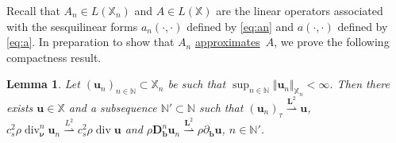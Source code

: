 \documentclass{m2an}
\newcommand{\csr}{c_s^2 \rho}
\newcommand{\nv}{\boldsymbol{\nu}}
\newcommand{\bflow}{\mathbf{b}}
\renewcommand{\u}{\mathbf{u}}
\renewcommand{\div}{\operatorname{div}}
\newcommand{\X}{\mathbb{X}}
\newcommand{\Xn}{\mathbb{X}_n}
\newcommand{\bD}{\mathbf{D}}
\newcommand{\bL}{\mathbf{L}}
\newcommand{\N}{\mathbb{N}}
\newcommand{\seq}[1]{(#1_n)_{n \in \mathbb{N}}}
\newcommand{\diffb}{\partial_{\bflow}}
\newcommand{\ddiffb}{\bD_{\bflow}^n}
\newcommand{\ddiv}{\div_{\nv}^n}
\newcommand{\PVol}[1]{(#1)_{\tau}}
\newcommand\approximates{\hyperlink{approximate}{approximates}}
\theoremstyle{plain}
\newtheorem{lemma}[theorem]{Lemma}
\theoremstyle{definition}
\begin{document}
Recall that $A_n \in L(\Xn)$ and $A \in L(\X)$ are the linear operators associated with the sesquilinear forms $a_n(\cdot,\cdot)$ defined by \eqref{eq:an} and $a(\cdot,\cdot)$ defined by \eqref{eq:a}. In preparation to show that $A_n$ \approximates~$A$, we prove the following compactness result. 


\begin{lemma}\label{lem:weakConvergence}
   Let $\seq{\u} \subset \Xn$ be such that $\sup_{n \in \N} \Vert \u_n \Vert_{\Xn} < \infty$. Then there exists $\u \in \X$ and a subsequence $\N' \subset \N$ such that $\PVol{\u_n} \overset{\bL^2}{\rightharpoonup} \u$, $\csr \ddiv \u_n \overset{L^2}{\rightharpoonup} \csr \div \u$ and $\rho \ddiffb \u_n \overset{\bL^2}{\rightharpoonup} \rho \diffb \u$, $n \in \N'$.
\end{lemma}
\end{document}
